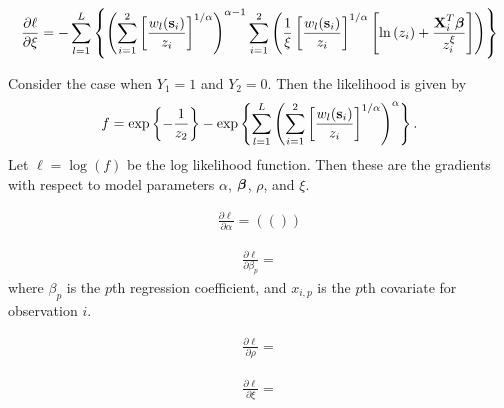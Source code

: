\documentclass[11pt]{article}
\begin{document}
\begin{align}
  \frac{ \partial \ell}{ \partial \xi } = -\sum _{l=1}^{L} \left\{
    \left( \sum_{i = 1}^2 \left[ \frac{ w_l(\mbox{\bf s}_i) }{z_i} \right]^{1 / \alpha} \right)^{\alpha - 1}
    \sum_{i = 1}^2 \left(
      \frac{1}{\xi} \left[ \frac{ w_l(\mbox{\bf s}_i)}{z_i} \right]^{1 / \alpha} \left[ \ln  \left( z_i \right) + \frac{ \mbox{\bf X}^T_i \mbox{\boldmath $\beta$} }{ z_i^\xi } \right]
    \right)
  \right\}
\end{align}

Consider the case when $Y_1 = 1$ and $Y_2 = 0$.
Then the likelihood is given by
\begin{align}
  f = \exp\left\{ - \frac{ 1 }{ z_2 } \right\} - \exp \left\{ \sum_{l = 1}^L \left( \sum_{i = 1}^2  \left[ \frac{ w_l(\mbox{\bf s}_i)}{z_i} \right]^{1 / \alpha} \right)^\alpha \right\}.
\end{align}
Let $\ell = \log(f)$ be the log likelihood function.
Then these are the gradients with respect to model parameters $\alpha$, $\mbox{\boldmath $\beta$}$, $\rho$, and $\xi$.

\begin{align}
  \frac{\partial \ell}{\partial \alpha} = ((  ))
\end{align}

\begin{align}
  \frac{\partial \ell}{ \partial \beta_p } =
\end{align}
where $\beta_p$ is the $p$th regression coefficient, and $x_{i, p}$ is the $p$th covariate for observation $i$.

\begin{align}
  \frac{ \partial \ell}{ \partial \rho } =
\end{align}

\begin{align}
  \frac{ \partial \ell}{ \partial \xi } =
\end{align}
\end{document}
